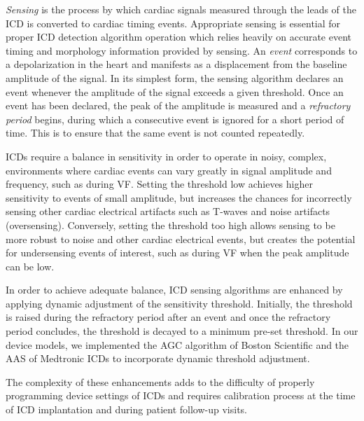 \emph{Sensing} is the process by which cardiac signals measured through the leads of the ICD is converted to cardiac timing events.
Appropriate sensing is essential for proper ICD detection algorithm operation which relies heavily on accurate event timing and morphology information provided by sensing. 
An \emph{event} corresponds to a depolarization in the heart and manifests as a displacement from the baseline amplitude of the signal.
In its simplest form, the sensing algorithm declares an event whenever the amplitude of the signal exceeds a given threshold.
Once an event has been declared, the peak of the amplitude is measured and a \emph{refractory period} begins, during which a consecutive event is ignored for a short period of time. 
This is to ensure that the same event is not counted repeatedly.

ICDs require a balance in sensitivity in order to operate in noisy, complex, environments where cardiac events can vary greatly in signal amplitude and frequency, such as during VF. 
Setting the threshold low achieves higher sensitivity to events of small amplitude, but increases the chances for incorrectly sensing other cardiac electrical artifacts such as T-waves and noise artifacts (oversensing). 
Conversely, setting the threshold too high allows sensing to be more robust to noise and other cardiac electrical events, but creates the potential for undersensing events of interest, such as during VF when the peak amplitude can be low. 

In order to achieve adequate balance, ICD sensing algorithms are enhanced by applying dynamic adjustment of the sensitivity threshold.
Initially, the threshold is raised during the refractory period after an event and once the refractory period concludes, the threshold is decayed to a minimum pre-set threshold.
In our device models, we implemented the AGC algorithm of Boston Scientific and the AAS of Medtronic ICDs to incorporate dynamic threshold adjustment. 


The complexity of these enhancements adds to the difficulty of properly programming device settings of ICDs and requires calibration process at the time of ICD implantation and during patient follow-up visits.
